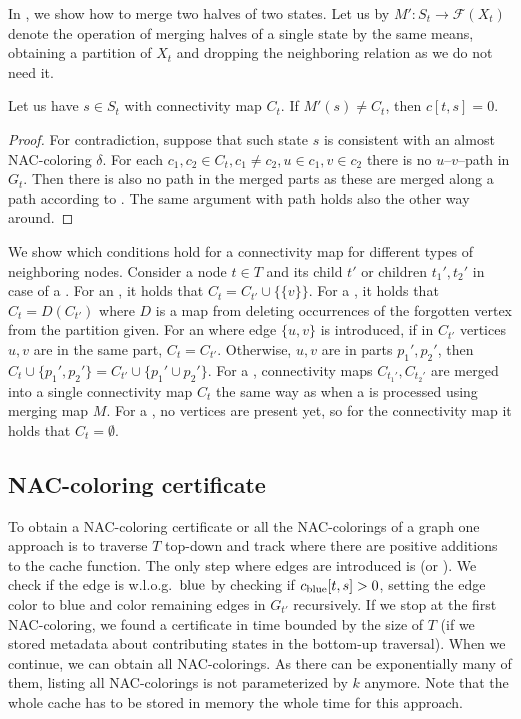 In , we show how to merge
two halves of two states. Let us by \( M': S_t \to \mathcal{F}(X_t) \) denote
the operation of merging halves of a single state by the same means,
obtaining a partition of \( X_t \) and dropping
the neighboring relation as we do not need it.
%
\begin{lemma}
	Let us have \( s \in S_t \) with connectivity map \( C_t \).
	If \( M'(s) \ne C_t \), then \( c[t, s] = 0 \).
\end{lemma}
%
\begin{proof}
	For contradiction, suppose that such state \( s \)
	is consistent with an almost NAC-coloring \( \delta \).
	For each \( c_1, c_2 \in C_t, c_1 \ne c_2, u \in c_1, v \in c_2 \)
	there is no \( u \)--\( v \)--path in \( G_t \).
	Then there is also no path in the merged parts as
	these are merged along a path according to .
	The same argument with path holds also the other way around.
\end{proof}
%
We show which conditions hold for a connectivity map
for different types of neighboring nodes.
Consider a node \( t \in T \) and its child \( t' \)
or children \( t_1', t_2' \) in case of a \JoinNode{}.
%
For an \IntroduceVertexNode{}, it holds that
\( C_t = C_{t'} \cup \{\{ v \}\} \).
%
For a \ForgetVertexNode{}, it holds that
\( C_t = D(C_{t'}) \)
where \( D \) is a map from 
deleting occurrences of the forgotten vertex from the partition given.
%
For an \IntroduceEdgeNode{}
where edge \( \{u, v\} \) is introduced,
if in \( C_{t'} \) vertices \( u, v \) are in the same part, \( C_t = C_{t'} \).
Otherwise, \( u, v \) are in parts \( p_1', p_2' \), then
\( C_t \cup \{p_1', p_2'\} = C_{t'} \cup \{ p_1' \cup p_2'\} \).
%
For a \JoinNode{},
connectivity maps \( C_{t_1'}, C_{t_2'} \) are merged into
a single connectivity map \( C_t \)
the same way as when a \JoinNode{} is processed using merging map \( M \).
%
For a \LeafNode{},
no vertices are present yet, so for the connectivity map it holds that \( C_t = \emptyset \).


\subsection{NAC-coloring certificate}

To obtain a NAC-coloring certificate or all the NAC-colorings of a graph
one approach is to traverse \( T \) top-down
and track where there are positive additions to the cache function.
%
The only step where edges are introduced is \IntroduceEdgeNode{}
(or \IntroduceVertexWithEdgesNode{}).
We check if the edge is w.l.o.g.\ \( \text{blue} \) by checking if \( c_{\text{blue}}[t,s] > 0 \),
setting the edge color to blue and color remaining edges in \( G_{t'} \) recursively.
If we stop at the first NAC-coloring, we found a certificate in time bounded by
the size of \( T \)
(if we stored metadata about contributing states in the bottom-up traversal).
%
When we continue, we can obtain all NAC-colorings.
As there can be exponentially many of them,
listing all NAC-colorings is not parameterized by \( k \) anymore.
Note that the whole cache has to be stored in memory
the whole time for this approach.

